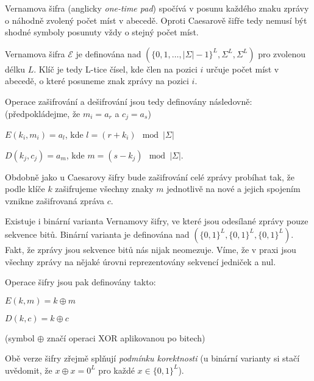 \documentclass[
  program=infoi,
  biblatex,
  figures=false,
  glossaries,
  index
]{kidiplom}
\begin{document}

    Vernamova šifra (anglicky \emph{one-time pad}) spočívá v posunu každého znaku zprávy o náhodně zvolený počet míst v abecedě.
    Oproti Caesarově šifře tedy nemusí být shodné symboly posunuty vždy o stejný počet míst.

    Vernamova šifra $\mathcal{E}$ je definována nad $(\{0, 1, \ldots, |\Sigma|-1\}^L, \Sigma^L, \Sigma^L)$ pro zvolenou délku $L$.
    Klíč je tedy L-tice čísel, kde člen na pozici $i$ určuje počet míst v abecedě, o které posuneme znak zprávy na pozici $i$.

    \medskip

    Operace zašifrování a dešifrování jsou tedy definovány následovně:
    (předpokládejme, že $m_i = a_r$ a $c_j = a_s$)

    \begin{center}
        $E(k_i, m_i) = a_l$, kde $l = (r+k_i)\mod{|\Sigma|}$

        $D(k_j, c_j) = a_m$, kde $m = (s-k_j)\mod{|\Sigma|}$.
    \end{center}

    Obdobně jako u Caesarovy šifry bude zašifrování celé zprávy probíhat tak, že podle klíče $k$ zašifrujeme všechny znaky $m$ jednotlivě na nové a
    jejich spojením vznikne zašifrovaná zpráva $c$.

    \bigskip

    Existuje i binární varianta Vernamovy šifry, ve které jsou odesílané zprávy pouze sekvence bitů.
    Binární varianta je definována nad $(\{0,1\}^L, \{0,1\}^L, \{0,1\}^L)$.
    Fakt, že zprávy jsou sekvence bitů nás nijak neomezuje. Víme, že v praxi jsou všechny zprávy na nějaké úrovni
    reprezentovány sekvencí jedniček a nul.

    \medskip

    Operace šifry jsou pak definovány takto:

    \begin{center}
        $E(k, m) = k \oplus m$

        $D(k, c) = k \oplus c$
    \end{center}

    (symbol $\oplus$ značí operaci XOR aplikovanou po bitech)

    \bigskip

    Obě verze šifry zřejmě splňují \emph{podmínku korektnosti} (u binární varianty si stačí uvědomit, že $x \oplus x = 0^L$ pro každé $x \in \{0,1\}^L$).
\end{document}
